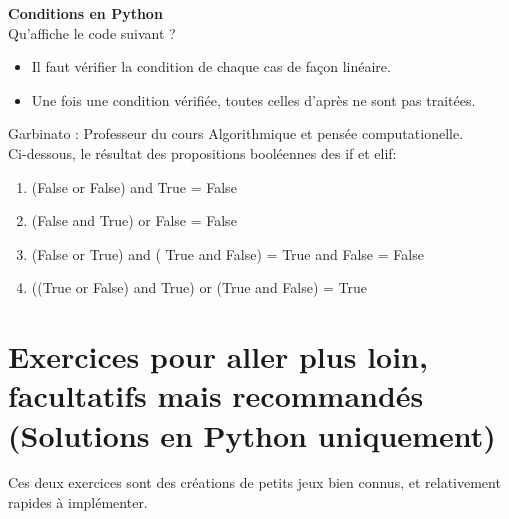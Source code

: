 \begin{Exercice}[5 minutes] \textbf{Conditions en Python}\\
  Qu'affiche le code suivant ?   \\
  
  
   
    \begin{conseil}
      	\begin{itemize}
      		\item Il faut vérifier la condition de chaque cas de façon linéaire.
      		\item Une fois une condition vérifiée, toutes celles d'après ne sont pas traitées.
      	\end{itemize}
        
    \end{conseil}
    \begin{solution}
    
    Garbinato : Professeur du cours Algorithmique et pensée computationelle. \\
    
    Ci-dessous, le résultat des propositions booléennes des if et elif: \\
    
    \begin{enumerate}
    	\item (False or False) and True = False
    	\item (False and True) or False = False
    	\item (False or True) and ( True and False) = True and False = False
    	\item ((True or False) and True) or (True and False) = True
    \end{enumerate}
           
    \end{solution}   
\end{Exercice}


\newpage
\section{Exercices pour aller plus loin, facultatifs mais recommandés (Solutions en Python uniquement)}
Ces deux exercices sont des créations de petits jeux bien connus, et relativement rapides à implémenter. \\



